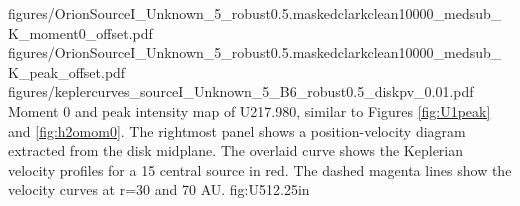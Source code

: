 \documentclass[twocolumn]{aastex61}
\begin{document}
\FigureThree
{{figures/OrionSourceI_Unknown_5_robust0.5.maskedclarkclean10000_medsub_K_moment0_offset}.pdf}
{{figures/OrionSourceI_Unknown_5_robust0.5.maskedclarkclean10000_medsub_K_peak_offset}.pdf}
{{figures/keplercurves_sourceI_Unknown_5_B6_robust0.5_diskpv_0.01}.pdf}
{Moment 0 and peak intensity map of U217.980, similar to Figures \ref{fig:U1peak} and \ref{fig:h2omom0}.
The rightmost panel shows a position-velocity diagram extracted from the disk midplane.
The overlaid  curve shows the Keplerian velocity profiles for a 15 \msun central source in red.
The dashed magenta lines show the velocity curves at r=30 and 70 AU.
}
{fig:U5}{1}{2.25in}
\end{document}
